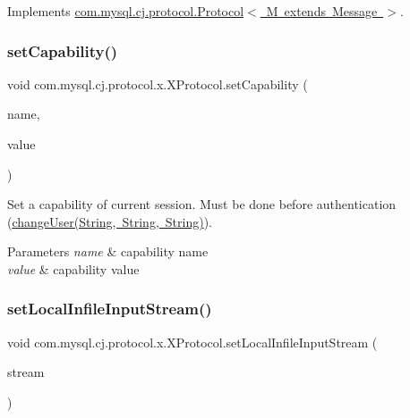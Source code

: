 Implements \mbox{\hyperlink{interfacecom_1_1mysql_1_1cj_1_1protocol_1_1_protocol_aaef9b7f93e895f19b2f6bc13ec5c2295}{com.\+mysql.\+cj.\+protocol.\+Protocol$<$ M extends Message $>$}}.

\mbox{\label{classcom_1_1mysql_1_1cj_1_1protocol_1_1x_1_1_x_protocol_a4c3435d8052e1759f91e14ae41137e02}} 
\subsubsection{\texorpdfstring{set\+Capability()}{setCapability()}}
{\footnotesize\ttfamily void com.\+mysql.\+cj.\+protocol.\+x.\+X\+Protocol.\+set\+Capability (\begin{DoxyParamCaption}\item[{String}]{name,  }\item[{Object}]{value }\end{DoxyParamCaption})}

Set a capability of current session. Must be done before authentication (\mbox{\hyperlink{classcom_1_1mysql_1_1cj_1_1protocol_1_1x_1_1_x_protocol_ada78c49db272f6f4a680c7d552f5be86}{change\+User(\+String, String, String)}}).


\begin{DoxyParams}{Parameters}
{\em name} & capability name \\
\hline
{\em value} & capability value \\
\hline
\end{DoxyParams}
\mbox{\label{classcom_1_1mysql_1_1cj_1_1protocol_1_1x_1_1_x_protocol_a4f539adc72747ef03c94bc92acde5efb}} 
\subsubsection{\texorpdfstring{set\+Local\+Infile\+Input\+Stream()}{setLocalInfileInputStream()}}
{\footnotesize\ttfamily void com.\+mysql.\+cj.\+protocol.\+x.\+X\+Protocol.\+set\+Local\+Infile\+Input\+Stream (\begin{DoxyParamCaption}\item[{Input\+Stream}]{stream }\end{DoxyParamCaption})}

